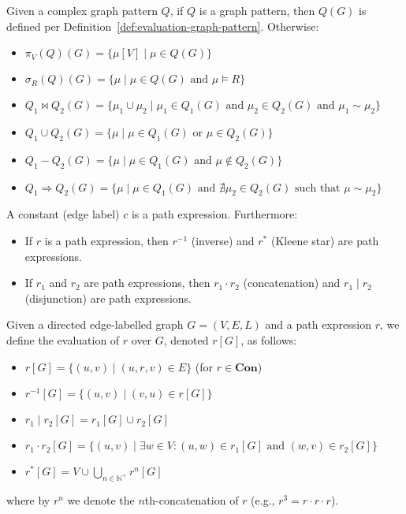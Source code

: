 \begin{definition}\label{def:complex-graph-pattern-evaluation}
    Given a complex graph pattern $Q$, if $Q$ is a graph pattern, then $Q(G)$ is defined per Definition~\ref{def:evaluation-graph-pattern}. Otherwise:
    \begin{itemize}
        \item $\pi_V(Q)(G) = \{\mu[V] \mid \mu \in Q(G)\}$
        \item $\sigma_R(Q)(G) = \{\mu \mid \mu \in Q(G) \text{ and } \mu \models R\}$
        \item $Q_1 \Join Q_2(G) = \{\mu_1 \cup \mu_2 \mid \mu_1 \in Q_1(G) \text{ and } \mu_2 \in Q_2(G) \text{ and } \mu_1 \sim \mu_2\}$
        \item $Q_1 \cup Q_2(G) = \{\mu \mid \mu \in Q_1(G) \text{ or } \mu \in Q_2(G)\}$
        \item $Q_1 - Q_2(G) = \{\mu \mid \mu \in Q_1(G) \text{ and } \mu \notin Q_2(G)\}$
        \item $Q_1 \Rightarrow Q_2(G) = \{\mu \mid \mu \in Q_1(G) \text{ and } \nexists \mu_2 \in Q_2(G) \text{ such that } \mu \sim \mu_2\}$
    \end{itemize}
\end{definition}

\begin{definition}\label{def:path-expression}
    A constant (edge label) $c$ is a path expression. Furthermore:
    \begin{itemize}
        \item If $r$ is a path expression, then $r^{-1}$ (inverse) and $r^*$ (Kleene star) are path expressions.
        \item If $r_1$ and $r_2$ are path expressions, then $r_1 \cdot r_2$ (concatenation) and $r_1 \mid r_2$ (disjunction) are path expressions.
    \end{itemize}
\end{definition}

\begin{definition}\label{def:path-expression-evaluation}
    Given a directed edge-labelled graph $G = (V, E, L)$ and a path expression $r$, we define the evaluation of $r$ over $G$, denoted $r[G]$, as follows:
    \begin{itemize}
        \item $r[G] = \{(u, v) \mid (u, r, v) \in E\}$ (for $r \in \textbf{Con}$)
        \item $r^{-1}[G] = \{(u, v) \mid (v, u) \in r[G]\}$
        \item $r_1 \mid r_2[G] = r_1[G] \cup r_2[G]$
        \item $r_1 \cdot r_2[G] = \{(u, v) \mid \exists w \in V : (u, w) \in r_1[G] \text{ and } (w, v) \in r_2[G]\}$
        \item $r^*[G] = V \cup \bigcup_{n \in \mathbb{N}^+} r^n[G]$
    \end{itemize}
    where by $r^n$ we denote the $n$th-concatenation of $r$ (e.g., $r^3 = r \cdot r \cdot r$).
\end{definition}

